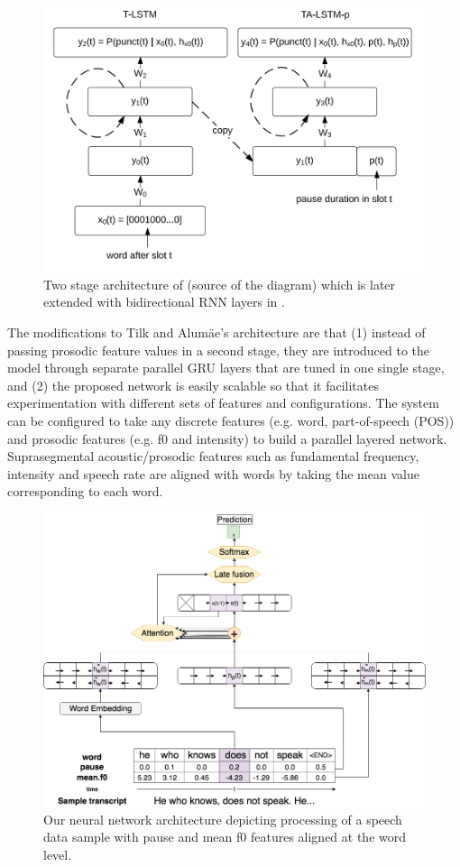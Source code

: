 \begin{figure}[h]
\centering\includegraphics[width=0.65\linewidth]{img/tilk_2stage.png}
\caption{Two stage architecture of \cite{tilk2015lstm} (source of the diagram) which is later extended with bidirectional RNN layers in \cite{tilk2016bidirectional}. }
\label{punkProse:figure:tilk_2stage}
\end{figure}

The modifications to Tilk and Alumäe's architecture are that (1) instead of passing prosodic feature values in a second stage, they are introduced to the model through separate parallel GRU layers that are tuned in one single stage, and (2) the proposed network is easily scalable so that it facilitates experimentation with different sets of features and configurations. The system can be configured to take any discrete features (e.g. word, part-of-speech (POS)) and prosodic features (e.g. f0 and intensity) to build a parallel layered network. Suprasegmental acoustic/prosodic features such as fundamental frequency, intensity and speech rate are aligned with words by taking the mean value corresponding to each word. 

\begin{figure}[h]
\centering\includegraphics[width=\linewidth]{img/parallelRNNet_updated.png}
\caption{Our neural network architecture depicting processing of a speech data sample with pause and mean f0 features aligned at the word level.}
\label{architecture}
\end{figure}


